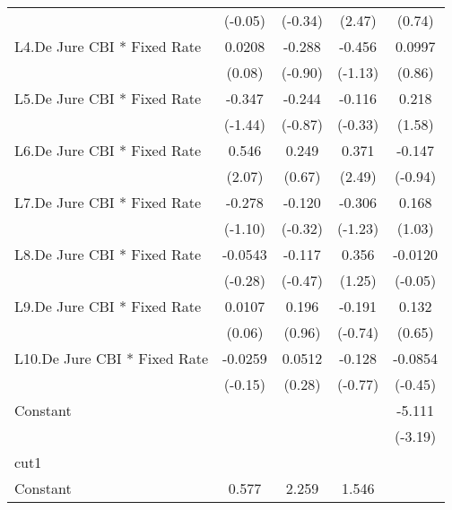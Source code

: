 {\begin{longtable}{l*{4}{c}}
                &  (-0.05)         &  (-0.34)         &   (2.47)         &   (0.74)         \\
[1em]
L4.De Jure CBI * Fixed Rate&   0.0208         &   -0.288         &   -0.456         &   0.0997         \\
                &   (0.08)         &  (-0.90)         &  (-1.13)         &   (0.86)         \\
[1em]
L5.De Jure CBI * Fixed Rate&   -0.347         &   -0.244         &   -0.116         &    0.218         \\
                &  (-1.44)         &  (-0.87)         &  (-0.33)         &   (1.58)         \\
[1em]
L6.De Jure CBI * Fixed Rate&    0.546\sym{*}  &    0.249         &    0.371\sym{*}  &   -0.147         \\
                &   (2.07)         &   (0.67)         &   (2.49)         &  (-0.94)         \\
[1em]
L7.De Jure CBI * Fixed Rate&   -0.278         &   -0.120         &   -0.306         &    0.168         \\
                &  (-1.10)         &  (-0.32)         &  (-1.23)         &   (1.03)         \\
[1em]
L8.De Jure CBI * Fixed Rate&  -0.0543         &   -0.117         &    0.356         &  -0.0120         \\
                &  (-0.28)         &  (-0.47)         &   (1.25)         &  (-0.05)         \\
[1em]
L9.De Jure CBI * Fixed Rate&   0.0107         &    0.196         &   -0.191         &    0.132         \\
                &   (0.06)         &   (0.96)         &  (-0.74)         &   (0.65)         \\
[1em]
L10.De Jure CBI * Fixed Rate&  -0.0259         &   0.0512         &   -0.128         &  -0.0854         \\
                &  (-0.15)         &   (0.28)         &  (-0.77)         &  (-0.45)         \\
[1em]
Constant        &                  &                  &                  &   -5.111\sym{**} \\
                &                  &                  &                  &  (-3.19)         \\
\hline
cut1            &                  &                  &                  &                  \\
Constant        &    0.577         &    2.259\sym{*}  &    1.546\sym{*}  &                  \\

\end{longtable}}
